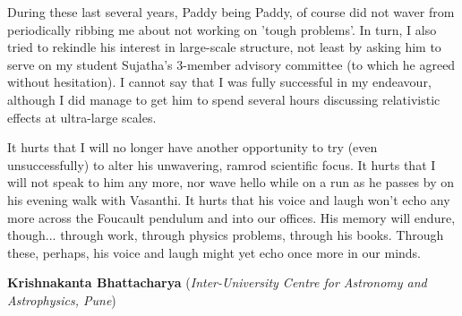 \documentclass[prd, preprint, longbibliography, 12pt]{revtex4-2}
\begin{document}
During these last several years, Paddy being Paddy, of course did not waver from periodically ribbing me about not working on 'tough problems'. In turn, I also tried to rekindle his interest in large-scale structure, not least by asking him to serve on my student Sujatha's 3-member advisory committee (to which he agreed without hesitation). I cannot say that I was fully successful in my endeavour, although I did manage to get him to spend several hours discussing relativistic effects at ultra-large scales. 

It hurts that I will no longer have another opportunity to try (even unsuccessfully) to alter his unwavering, ramrod scientific focus. It hurts that I will not speak to him any more, nor wave hello while on a run as he passes by on his evening walk with Vasanthi. It hurts that his voice and laugh won't echo any more across the Foucault pendulum and into our offices. His memory will endure, though... through work, through physics problems, through his books. Through these, perhaps, his voice and laugh might yet echo once more in our minds.

\bigskip

\bigskip
\bigskip
\centerline{{\bf Krishnakanta Bhattacharya} ({\it Inter-University Centre for Astronomy and Astrophysics, Pune})}
\smallskip
{}
\end{document}

